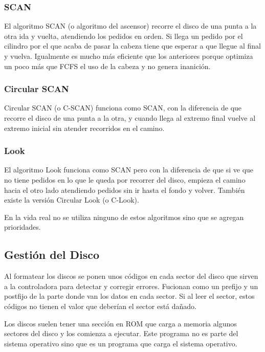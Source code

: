 \documentclass{article}
\begin{document}
\subsubsection{SCAN}

El algoritmo SCAN (o algoritmo del ascensor) recorre el disco de una punta a la otra ida y vuelta, atendiendo los pedidos en orden. Si llega un pedido por el cilindro por el que acaba de pasar la cabeza tiene que esperar a que llegue al final y vuelva. Igualmente es mucho m\'as eficiente que los anteriores porque optimiza un poco m\'as que FCFS el uso de la cabeza y no genera inanici\'on.

\subsubsection{Circular SCAN}

Circular SCAN (o C-SCAN) funciona como SCAN, con la diferencia de que recorre el disco de una punta a la otra, y cuando llega al extremo final vuelve al extremo inicial sin atender recorridos en el camino.

\subsubsection{Look}

El algoritmo Look funciona como SCAN pero con la diferencia de que si ve que no tiene pedidos en lo que le queda por recorrer del disco, empieza el camino hacia el otro lado atendiendo pedidos sin ir hasta el fondo y volver. Tambi\'en existe la versi\'on Circular Look (o C-Look).

En la vida real no se utiliza ninguno de estos algoritmos sino que se agregan prioridades.

\subsection{Gesti\'on del Disco}

Al formatear los discos se ponen unos c\'odigos en cada sector del disco que sirven a la controladora para detectar y corregir errores. Fucionan como un prefijo y un postfijo de la parte donde van los datos en cada sector. Si al leer el sector, estos c\'odigos no tienen el valor que deber\'ian el sector est\'a da\~nado.

Los discos suelen tener una secci\'on en ROM que carga a memoria algunos sectores del disco y los comienza a ejecutar. Este programa no es parte del sistema operativo sino que es un programa que carga el sistema operativo.
\end{document}
